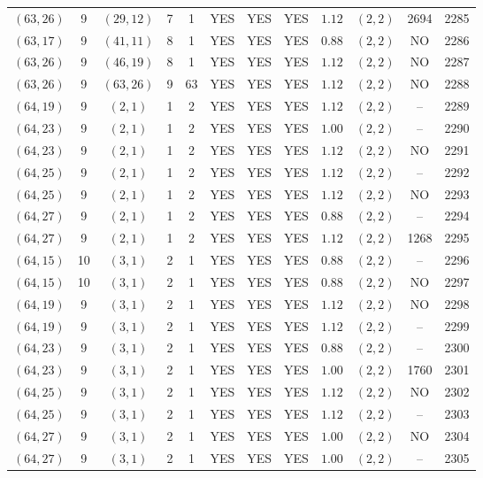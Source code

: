 \begin{longtable}{|c|c|c|c|c|c|c|c|c|c|c|c|}
$(63,26)$ & 9 & $(29,12)$ & 7 & 1 & YES & YES & YES & $1.12$ & $(2,2)$ & 2694 & 2285\\
$(63,17)$ & 9 & $(41,11)$ & 8 & 1 & YES & YES & YES & $0.88$ & $(2,2)$ & NO & 2286\\
$(63,26)$ & 9 & $(46,19)$ & 8 & 1 & YES & YES & YES & $1.12$ & $(2,2)$ & NO & 2287\\
$(63,26)$ & 9 & $(63,26)$ & 9 & 63 & YES & YES & YES & $1.12$ & $(2,2)$ & NO & 2288\\
$(64,19)$ & 9 & $(2,1)$ & 1 & 2 & YES & YES & YES & $1.12$ & $(2,2)$ & -- & 2289\\
$(64,23)$ & 9 & $(2,1)$ & 1 & 2 & YES & YES & YES & $1.00$ & $(2,2)$ & -- & 2290\\
$(64,23)$ & 9 & $(2,1)$ & 1 & 2 & YES & YES & YES & $1.12$ & $(2,2)$ & NO & 2291\\
$(64,25)$ & 9 & $(2,1)$ & 1 & 2 & YES & YES & YES & $1.12$ & $(2,2)$ & -- & 2292\\
$(64,25)$ & 9 & $(2,1)$ & 1 & 2 & YES & YES & YES & $1.12$ & $(2,2)$ & NO & 2293\\
$(64,27)$ & 9 & $(2,1)$ & 1 & 2 & YES & YES & YES & $0.88$ & $(2,2)$ & -- & 2294\\
$(64,27)$ & 9 & $(2,1)$ & 1 & 2 & YES & YES & YES & $1.12$ & $(2,2)$ & 1268 & 2295\\
$(64,15)$ & 10 & $(3,1)$ & 2 & 1 & YES & YES & YES & $0.88$ & $(2,2)$ & -- & 2296\\
$(64,15)$ & 10 & $(3,1)$ & 2 & 1 & YES & YES & YES & $0.88$ & $(2,2)$ & NO & 2297\\
$(64,19)$ & 9 & $(3,1)$ & 2 & 1 & YES & YES & YES & $1.12$ & $(2,2)$ & NO & 2298\\
$(64,19)$ & 9 & $(3,1)$ & 2 & 1 & YES & YES & YES & $1.12$ & $(2,2)$ & -- & 2299\\
$(64,23)$ & 9 & $(3,1)$ & 2 & 1 & YES & YES & YES & $0.88$ & $(2,2)$ & -- & 2300\\
$(64,23)$ & 9 & $(3,1)$ & 2 & 1 & YES & YES & YES & $1.00$ & $(2,2)$ & 1760 & 2301\\
$(64,25)$ & 9 & $(3,1)$ & 2 & 1 & YES & YES & YES & $1.12$ & $(2,2)$ & NO & 2302\\
$(64,25)$ & 9 & $(3,1)$ & 2 & 1 & YES & YES & YES & $1.12$ & $(2,2)$ & -- & 2303\\
$(64,27)$ & 9 & $(3,1)$ & 2 & 1 & YES & YES & YES & $1.00$ & $(2,2)$ & NO & 2304\\
$(64,27)$ & 9 & $(3,1)$ & 2 & 1 & YES & YES & YES & $1.00$ & $(2,2)$ & -- & 2305\\

\end{longtable}
